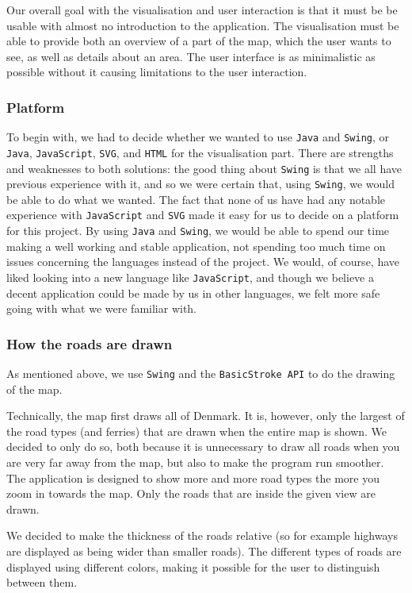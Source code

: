 Our overall goal with the visualisation and user interaction is that it must be be usable with almost no introduction to the application. The visualisation must be able to provide both an overview of a part of the map, which the user wants to see, as well as details about an area. The user interface is as minimalistic as possible without it causing limitations to the user interaction.

\subsubsection{Platform}
To begin with, we had to decide whether we wanted to use \texttt{Java} and \texttt{Swing}, or \texttt{Java}, \texttt{JavaScript}, \texttt{SVG}, and \texttt{HTML} for the visualisation part. There are strengths and weaknesses to both solutions: the good thing about \texttt{Swing} is that we all have previous experience with it, and so we were certain that, using \texttt{Swing}, we would be able to do what we wanted. 
The fact that none of us have had any notable experience with \texttt{JavaScript} and \texttt{SVG} made it easy for us to decide on a platform for this project. By using \texttt{Java} and \texttt{Swing}, we would be able to spend our time making a well working and stable application, not spending too much time on issues concerning the languages instead of the project. We would, of course, have liked looking into a new language like \texttt{JavaScript}, and though we believe a decent application could be made by us in other languages, we felt more safe going with what we were familiar with.

\subsubsection{How the roads are drawn}
As mentioned above, we use \texttt{Swing} and the \texttt{BasicStroke API} to do the drawing of the map. 

Technically, the map first draws all of Denmark. It is, however, only the largest of the road types (and ferries) that are drawn when the entire map is shown. We decided to only do so, both because it is unnecessary to draw all roads when you are very far away from the map, but also to make the program run smoother. The application is designed to show more and more road types the more you zoom in towards the map. Only the roads that are inside the given view are drawn.

We decided to make the thickness of the roads relative (so for example highways are displayed as being wider than smaller roads). The different types of roads are displayed using different colors, making it possible for the user to distinguish between them.

